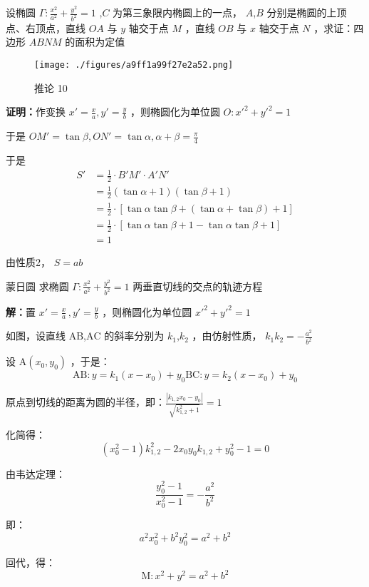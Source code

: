 \begin{corollary}{}
设椭圆 $\displaystyle{\Gamma:\frac{x^2}{a^2}+\frac{y^2}{b^2}=1}$ ,$\displaystyle{C}$ 为第三象限内椭圆上的一点， $\displaystyle{A}$,$\displaystyle{B}$ 分别是椭圆的上顶点、右顶点，直线 $\displaystyle{OA}$ 与 $\displaystyle{y}$ 轴交于点 $\displaystyle{M}$ ，直线 $\displaystyle{OB}$ 与 $\displaystyle{x}$ 轴交于点 $\displaystyle{N}$ ，求证：四边形 $\displaystyle{ABNM}$ 的面积为定值\begin{figure}[ht]
\centering
\texttt{[image: ./figures/a9ff1a99f27e2a52.png]}
\caption{推论 10} \label{fig_affine_8}
\end{figure}

\textbf{证明：}作变换 $\displaystyle{x'=\frac{x}{a},y'=\frac{y}{b}}$ ，则椭圆化为单位圆 $\displaystyle{O:x'^2+y'^2=1}$

于是 $\displaystyle{OM'=\tan{\beta},ON'=\tan{\alpha},\alpha+\beta=\frac{\pi}{4}}$ 

于是
$$
\begin{aligned}
 S'&=\frac{1}{2}\cdot B'M'\cdot A'N'\\
 &=\frac{1}{2}(\tan\alpha+1)(\tan\beta+1)\\
 &=\frac{1}{2}\cdot\left[\tan\alpha\tan\beta+(\tan\alpha+\tan\beta)+1\right]\\
 &=\frac{1}{2}\cdot[\tan\alpha\tan\beta+1-\tan\alpha\tan\beta+1]\\
 &=1 
\end{aligned}
$$

由性质2， $\displaystyle{S=ab}$ 
\end{corollary}
\begin{corollary}{蒙日圆}
求椭圆 $\displaystyle{\Gamma:\frac{x^2}{a^2}+\frac{y^2}{b^2}=1}$ 两垂直切线的交点的轨迹方程

\textbf{解：}置 $\displaystyle{x'=\frac{x}{a}\,,y'=\frac{y}b}$ ，则椭圆化为单位圆 $\displaystyle{x'^2+y'^2=1}$ 

如图，设直线 $\displaystyle{\text{AB}}$,$\displaystyle{\text{AC}}$ 的斜率分别为 $\displaystyle{k_1}$,$\displaystyle{k_2}$ ，由仿射性质， $\displaystyle{k_1k_2=-\frac{a^2}{b^2}}$ 

设 $\displaystyle{\text{A}(x_0,y_0)}$ ，于是： 
$$\text{AB}:y=k_1(x-x_0)+y_0\text{BC}:y=k_2(x-x_0)+y_0 $$

原点到切线的距离为圆的半径，即：$\displaystyle{\frac{|k_{1,2}x_0-y_0|}{\sqrt{k_{1,2}^2+1}}=1}$

化简得：
$$(x_0^2-1)k_{1,2}^2-2x_0y_0k_{1,2}+y_0^2-1=0$$

由韦达定理：
$$\frac{y_0^2-1}{x_0^2-1}=-\frac{a^2}{b^2}$$

即：
$$a^2x_0^2+b^2y_0^2=a^2+b^2$$

回代，得：
$$\text{M}:x^2+y^2=a^2+b^2$$
\end{corollary}
